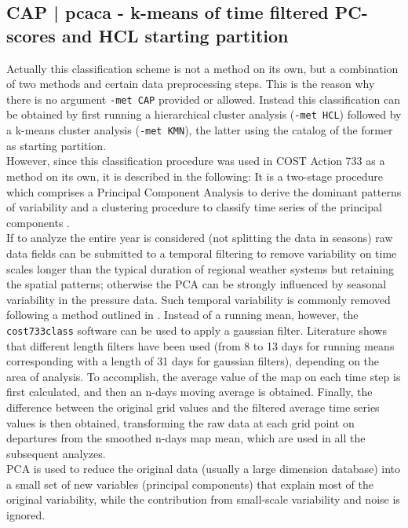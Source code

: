 \documentclass[12pt, oneside, a4paper, headsepline, plainheadsepline]{scrbook}
\begin{document}
\subsection{CAP | pcaca - k-means of time filtered PC-scores and HCL starting partition}
Actually this classification scheme is not a method on its own, but a combination of two methods and certain data preprocessing steps. This is the reason why there is no argument \verb+-met CAP+ provided or allowed. Instead this classification can be obtained by first running a hierarchical cluster analysis (\verb+-met HCL+) followed by a k-means cluster analysis (\verb+-met KMN+), the latter using the catalog of the former as starting partition.\\
However, since this classification procedure was used in COST Action 733 as a method on its own, it is described in the following:
It is a two-stage procedure which comprises a Principal Component Analysis to derive the dominant patterns of variability and a clustering procedure to classify time series of the principal components \citep{Comrie1996,Ekstrom2002}. \\
If to analyze the entire year is considered (not splitting the data in seasons) raw data fields can be submitted to a temporal filtering to remove variability on time scales longer than the typical duration of regional weather systems but retaining the spatial patterns; otherwise the PCA can be strongly influenced by seasonal variability in the pressure data. Such temporal variability is commonly removed following a method outlined in \cite{Hewitson1992}. Instead of a running mean, however, the \verb+cost733class+ software can be used to apply a gaussian filter. Literature shows that different length filters have been used (from 8 to 13 days for running means corresponding with a length of 31 days for gaussian filters), depending on the area of analysis. To accomplish, the average value of the map on each time step is first calculated, and then an n-days moving average is obtained. Finally, the difference between the original grid values and the filtered average time series values is then obtained, transforming the raw data at each grid point on departures from the smoothed n-days map mean, which are used in all the subsequent analyzes.\\
PCA is used to reduce the original data (usually a large dimension database) into a small set of new variables (principal components) that explain most of the original variability, while the contribution from small-scale variability and noise is ignored. \\
\end{document}
